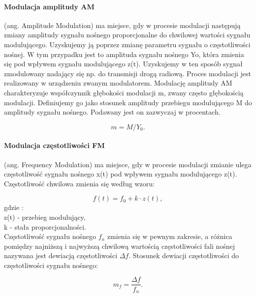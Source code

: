 \documentclass[a4paper,twoside]{report}
\begin{document}
\paragraph{Modulacja amplitudy AM} (ang. Amplitude Modulation) ma miejsce, gdy w procesie modulacji następują zmiany amplitudy sygnału nośnego proporcjonalne do chwilowej wartości sygnału modulującego. Uzyskujemy ją poprzez zmianę parametru sygnału o częstotliwości nośnej. W tym przypadku jest to amplituda sygnału nośnego Yo, która zmienia się pod wpływem sygnału modulującego z(t). Uzyskujemy w ten sposób sygnał zmodulowany nadający się np. do transmisji drogą radiową. Proces modulacji jest realizowany w urządzeniu zwanym modulatorem. Modulację amplitudy AM charakteryzuje współczynnik głębokości modulacji m, zwany często głębokością modulacji. Definiujemy go jako stosunek amplitudy przebiegu modulującego M do amplitudy sygnału nośnego. Podawany jest on zazwyczaj w procentach. 

\begin{equation}
m=M/Y_0.
\end{equation}

\paragraph{Modulacja częstotliwości FM} (ang. Frequency Modulation) ma miejsce, gdy w procesie modulacji zmianie ulega częstotliwość sygnału nośnego x(t) pod wpływem sygnału modulującego z(t). Częstotliwość chwilowa zmienia się według wzoru:

\begin{equation}
f(t)=f_0+k\cdot z(t),
\end{equation}
gdzie : \\
z(t) - przebieg modulujący,\\
k - stała proporcjonalności.\\

Częstotliwość sygnału nośnego $f_n$ zmienia się w pewnym zakresie, a różnica pomiędzy najniższą i najwyższą chwilową wartością częstotliwości fali nośnej nazywana jest dewiacją częstotliwości $\Delta f$. Stosunek dewiacji częstotliwości do częstotliwości sygnału nośnego:

\begin{equation}
 m_f=\dfrac{\Delta f}{f_n}. 
\end{equation}
\end{document}
